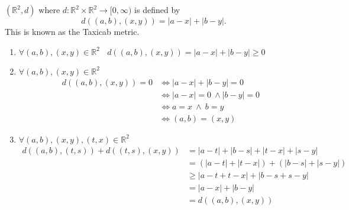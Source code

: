 \begin{example}
    $(\mathbb{R}^2, d)$ where $d:\mathbb{R}^2 \times \mathbb{R}^2 \rightarrow [0, \infty)$ is defined by
    $$d((a,b),(x,y))=|a-x| + |b-y|.$$
    This is known as the Taxicab metric.
    \begin{enumerate}[$(i)$]
        \item $\forall (a,b),(x,y) \in \mathbb{R}^2 ~~~~d((a,b),(x,y)) = |a-x| + |b-y| \geq 0$
        \item $\forall (a,b),(x,y) \in \mathbb{R}^2$ \begin{align*} d((a,b),(x,y)) =0 &\iff |a-x| + |b-y| = 0 \\ &\iff |a-x| = 0 ~\wedge |b-y|=0 \\ &\iff a=x ~\wedge ~b=y \\ &\iff (a,b) = (x,y)\end{align*}
        \item $\forall (a,b),(x,y),(t,x)\in \mathbb{R}^2$
        \begin{align*}
            d((a,b),(t,s)) + d((t,s),(x,y)) &= |a-t| + |b-s| + |t-x| + |s-y| \\
            &=(|a-t| + |t-x|) + (|b-s| + |s-y|) \\
            &\geq |a-t + t-x| + |b-s+s-y| \\
            &=|a-x| + |b-y| \\
            &=d((a,b),(x,y))
        \end{align*}
    \end{enumerate}
\end{example}


